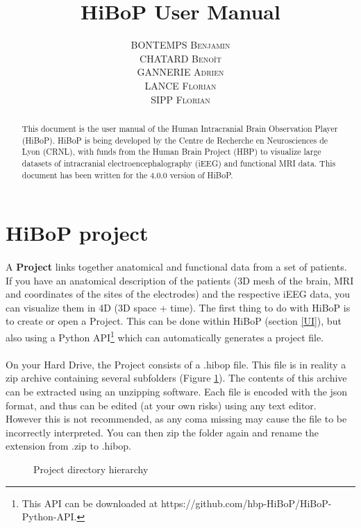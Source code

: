 \documentclass[a4paper]{article}
\title{HiBoP User Manual}
\author{\textsc{BONTEMPS Benjamin} \\ \textsc{CHATARD Benoît} \\ \textsc{GANNERIE Adrien} \\ \textsc{LANCE Florian} \\ \textsc{SIPP Florian}}
\begin{document}
\maketitle
\begin{abstract}
This document is the user manual of the Human Intracranial Brain Observation Player (HiBoP). HiBoP is being developed by the Centre de Recherche en Neurosciences de Lyon (CRNL), with funds from the Human Brain Project (HBP) to visualize large datasets of intracranial electroencephalography (iEEG) and functional MRI data. This document has been written for the 4.0.0 version of HiBoP.
\end{abstract}
\tableofcontents
\section{HiBoP project} \label{data}
\paragraph{} A \textbf{Project} links together anatomical and functional data from a set of patients. If you have an anatomical description of the patients (3D mesh of the brain, MRI and coordinates of the sites of the electrodes) and the respective iEEG data, you can visualize them in 4D (3D space + time). The first thing to do with HiBoP is to create or open a Project. This can be done within HiBoP (section \ref{UI}), but also using a Python API\footnote{This API can be downloaded at https://github.com/hbp-HiBoP/HiBoP-Python-API.} which can automatically generates a project file.
\paragraph{} On your Hard Drive, the Project consists of a .hibop file. This file is in reality a zip archive containing several subfolders (Figure \ref{projectDirectory}). The contents of this archive can be extracted using an unzipping software. Each file is encoded with the json format, and thus can be edited (at your own risks) using any text editor. However this is not recommended, as any coma missing may cause the file to be incorrectly interpreted. You can then zip the folder again and rename the extension from .zip to .hibop.
\begin{figure}[H]
\caption{\label{projectDirectory}Project directory hierarchy}
\end{figure}
\end{document}
